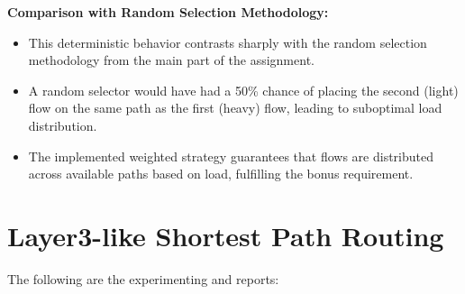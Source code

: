 \documentclass[12pt]{article}
\begin{document}
\noindent \textbf{Comparison with Random Selection Methodology:}
\begin{itemize}
    \item This deterministic behavior contrasts sharply with the random selection methodology from the main part of the assignment. 
    \item A random selector would have had a 50\% chance of placing the second (light) flow on the same path as the first (heavy) flow, leading to suboptimal load distribution. 
    \item The implemented weighted strategy guarantees that flows are distributed across available paths based on load, fulfilling the bonus requirement.
    
\end{itemize}

\section{Layer3-like Shortest Path Routing}

The following are the experimenting and reports:
\end{document}
